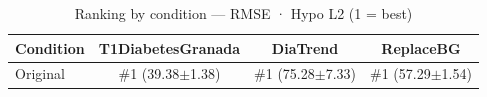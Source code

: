 \begin{table}[htbp]
\centering
\small
\caption{Ranking by condition — RMSE · Hypo L2  (1 = best)}
\label{tab:ranking_rmse_tbr_2_family_size_baseline}
\begin{tabular}{lccc}
\toprule
\textbf{Condition} & \textbf{T1DiabetesGranada} & \textbf{DiaTrend} & \textbf{ReplaceBG} \\
\midrule
Original & \#1 (39.38$\pm$1.38) & \#1 (75.28$\pm$7.33) & \#1 (57.29$\pm$1.54) \\
\bottomrule
\end{tabular}
\end{table}